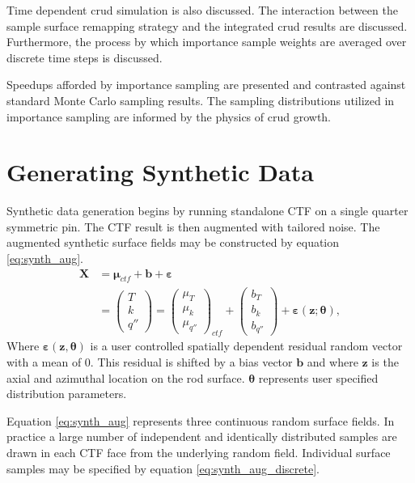 Time dependent crud simulation is also discussed.  The interaction between the sample surface remapping strategy and the integrated crud results are discussed.  Furthermore, the process by which importance sample weights are averaged over discrete time steps is discussed.

Speedups afforded by importance sampling are presented and contrasted against standard Monte Carlo sampling results.  The sampling distributions utilized in importance sampling are informed by the physics of crud growth.

\section{Generating Synthetic Data}

Synthetic data generation begins by running standalone CTF on a single quarter symmetric pin.   The CTF result is then augmented with tailored noise.  The augmented synthetic surface fields may be constructed by equation \ref{eq:synth_aug}.
\begin{align}
    \bm X &= \bm \mu_{ctf} + \bm b + \bm \varepsilon \nonumber \\
          &=
    \begin{pmatrix}
        T \\
        k \\
        q''
    \end{pmatrix}
    =
    \begin{pmatrix}
        \mu_{T} \\
        \mu_k \\
        \mu_{q''}
    \end{pmatrix}_{ctf}
    + \begin{pmatrix}
        b_{T} \\
        b_k \\
        b_{q''}
    \end{pmatrix}
    + \bm{\varepsilon} (\mathbf z; \bm \theta),
\label{eq:synth_aug}
\end{align}
Where $\bm \varepsilon(\mathbf z, \bm \theta)$ is a user controlled spatially dependent residual random vector with a mean of 0.  This residual is
shifted by a bias vector
$\mathbf b$ and where $\mathbf z$ is the axial and azimuthal location on the rod surface.
$\bm \theta$ represents user specified distribution parameters.

Equation \ref{eq:synth_aug} represents three continuous random surface fields.  In practice a large number of independent and identically distributed samples are drawn in each CTF face from the underlying random field.  Individual surface samples may be specified by equation \ref{eq:synth_aug_discrete}.

